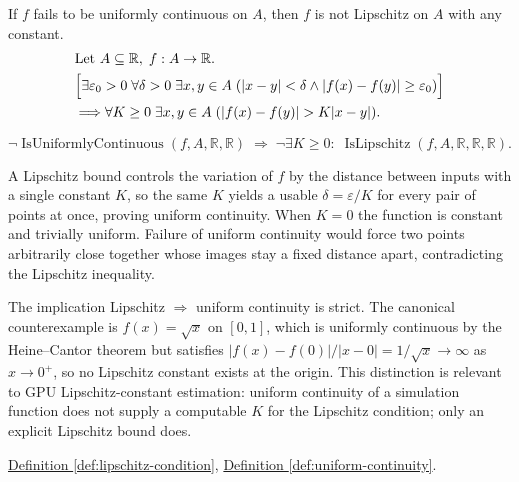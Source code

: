 \begin{remark*}[Interpretation]
If $f$ fails to be uniformly continuous on $A$, then $f$ is not Lipschitz on $A$ with any constant.
\[
\begin{aligned}
&\text{Let } A \subseteq \mathbb{R},\; f:A \to \mathbb{R}.\\
&\Bigl[\exists \varepsilon_0>0\;\forall \delta>0\;\exists x,y \in A\;(|x-y|<\delta \land |f(x)-f(y)|\ge\varepsilon_0)\Bigr]\\
&\Longrightarrow \forall K\ge 0\;\exists x,y \in A\;(|f(x)-f(y)|>K|x-y|).
\end{aligned}
\]


\[
\neg\operatorname{IsUniformlyContinuous}(f,A,\mathbb R,\mathbb R)
\;\Longrightarrow\;
\neg\exists K\ge 0:\;\operatorname{IsLipschitz}(f,A,\mathbb{R},\mathbb{R},\mathbb{R}).
\]


A Lipschitz bound controls the variation of $f$ by the distance between inputs with a single constant $K$, so the same $K$ yields a usable $\delta = \varepsilon/K$ for every pair of points at once, proving uniform continuity. When $K=0$ the function is constant and trivially uniform. Failure of uniform continuity would force two points arbitrarily close together whose images stay a fixed distance apart, contradicting the Lipschitz inequality.


The implication Lipschitz $\Rightarrow$ uniform continuity is strict. The canonical counterexample is $f(x)=\sqrt{x}$ on $[0,1]$, which is uniformly continuous by the Heine--Cantor theorem but satisfies $|f(x)-f(0)|/|x-0| = 1/\sqrt{x} \to \infty$ as $x \to 0^+$, so no Lipschitz constant exists at the origin. This distinction is relevant to GPU Lipschitz-constant estimation: uniform continuity of a simulation function does not supply a computable $K$ for the Lipschitz condition; only an explicit Lipschitz bound does.
\end{remark*}

\begin{dependencies}
\hyperref[def:lipschitz-condition]{Definition \ref*{def:lipschitz-condition}}, \hyperref[def:uniform-continuity]{Definition \ref*{def:uniform-continuity}}.
\end{dependencies}


